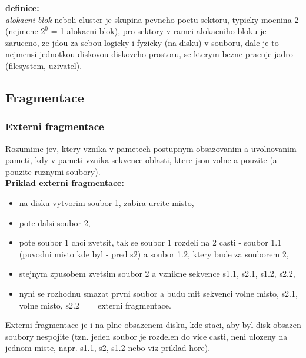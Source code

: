 \documentclass[a4paper, 11pt]{article}
\begin{document}
\noindent\textbf{definice:} \\[0.5em]
\textit{alokacni blok} neboli cluster je skupina pevneho poctu sektoru, typicky mocnina 2 (nejmene $2^0$ = 1 alokacni blok), pro sektory v ramci alokacniho bloku je zaruceno, ze jdou za sebou logicky i fyzicky (na disku) v souboru, dale je to nejmensi jednotkou diskovou diskoveho prostoru, se kterym bezne pracuje jadro (filesystem, uzivatel). \\

\newpage

\subsection{Fragmentace}

\subsubsection{Externi fragmentace}

Rozumime jev, ktery vznika v pametech postupnym obsazovanim a uvolnovanim pameti, kdy v pameti vznika sekvence oblasti, ktere jsou volne a pouzite (a pouzite ruznymi soubory). \\

\noindent\textbf{Priklad externi fragmentace:}
\begin{itemize}
    \item na disku vytvorim soubor 1, zabira urcite misto,
    \item pote dalsi soubor 2,
    \item pote soubor 1 chci zvetsit, tak se soubor 1 rozdeli na 2 casti - soubor 1.1 (puvodni misto kde byl - pred s2) a soubor 1.2, ktery bude za souborem 2,
    \item stejnym zpusobem zvetsim soubor 2 a vznikne sekvence s1.1, s2.1, s1.2, s2.2,
    \item nyni se rozhodnu smazat prvni soubor a budu mit sekvenci volne misto, s2.1, volne misto, s2.2 == externi fragmentace. \\
\end{itemize}

\noindent Externi fragmentace je i na plne obsazenem disku, kde staci, aby byl disk obsazen soubory nespojite (tzn. jeden soubor je rozdelen do vice casti, neni ulozeny na jednom miste, napr. s1.1, s2, s1.2 nebo viz priklad hore). \\
\end{document}
